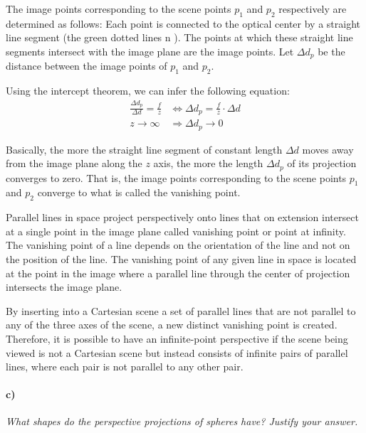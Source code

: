 \documentclass[a4paper,twocolumn]{article}
\newcommand{\subtask}[2]{\paragraph{#1)} \textit{#2} \newline}
\begin{document}
	The image points corresponding to the scene points $p_1$ and $p_2$ respectively are determined as follows: Each point is connected to the optical center by a straight line segment (the green dotted lines n ). The points at which these straight line segments intersect with the image plane are the image points. Let $\Delta d_p$ be the distance between the image points of $p_1$ and $p_2$.
	
	Using the intercept theorem, we can infer the following equation:
	\begin{align*}
		\frac{\Delta d_p}{\Delta d} = \frac{f}{z} &\Leftrightarrow
		\Delta d_p = \frac{f}{z} \cdot \Delta d \\
		z \rightarrow \infty &\Rightarrow \Delta d_p \rightarrow 0
	\end{align*}
	
	Basically, the more the straight line segment of constant length $\Delta d$ moves away from the image plane along the $z$ axis, the more the length $\Delta d_p$ of its projection converges to zero. That is, the image points corresponding to the scene points $p_1$ and $p_2$ converge to what is called the vanishing point.


	
	Parallel lines in space project perspectively onto lines that on extension intersect at a single point in the image plane called vanishing point or point at infinity. The vanishing point of a line depends on the orientation of the line and not on the position of the line. The vanishing point of any given line in space is located at the point in the image where a parallel line through the center of projection intersects the image plane.
	
	By inserting into a Cartesian scene a set of parallel lines that are not parallel to any of the three axes of the scene, a new distinct vanishing point is created. Therefore, it is possible to have an infinite-point perspective if the scene being viewed is not a Cartesian scene but instead consists of infinite pairs of parallel lines, where each pair is not parallel to any other pair.
	
	\subtask{c}{What shapes do the perspective projections of spheres have? Justify your answer.}
	
\end{document}
